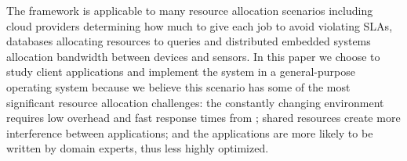 The \pacora framework is applicable to many resource allocation scenarios including cloud providers determining how much to give each job to avoid violating SLAs, databases allocating resources to queries and distributed embedded systems allocation bandwidth between devices and sensors.  In this paper we choose to study client applications and implement the system in a general-purpose operating system because we believe this scenario has some of the most significant resource allocation challenges: the constantly changing environment requires low overhead and fast response times from \pacora;  shared resources create more interference between applications; and the applications are more likely to be written by domain experts, thus less highly optimized.


